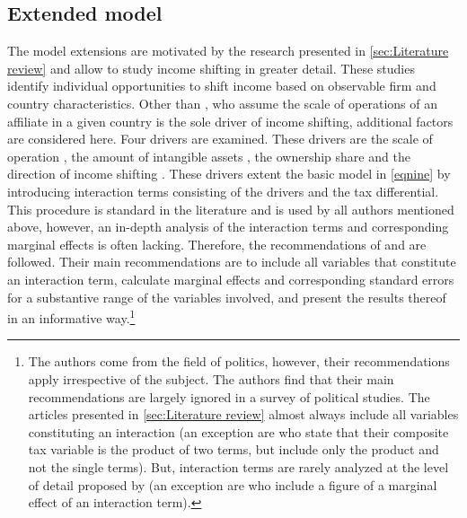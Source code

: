 \documentclass[10pt,twocolumn,oneside,cmyk]{article}
\begin{document}
\subsection{Extended model} \label{sec:Extended model}
The model extensions are motivated by the research presented in \cref{sec:Literature review} and allow to study income shifting in greater detail. These studies identify individual opportunities to shift income based on observable firm and country characteristics. Other than \textcite{huizinga_international_2008}, who assume the scale of operations of an affiliate in a given country is the sole driver of income shifting, additional factors are considered here. Four drivers are examined. These drivers are the scale of operation \textcite{huizinga_international_2008}, the amount of intangible assets \parencites{beer_profit_2015}{dischinger_corporate_2011}, the ownership share \parencites{weichenrieder_profit_2009}{dischinger_profit_2008} and the direction of income shifting \parencite{dischinger_role_2014}. These drivers extent the basic model in \cref{eqnine} by introducing interaction terms consisting of the drivers and the tax differential. This procedure is standard in the literature and is used by all authors mentioned above, however, an in-depth analysis of the interaction terms and corresponding marginal effects is often lacking. Therefore, the recommendations of \textcite[64]{brambor_understanding_2006} and \textcite[660]{berry_improving_2012} are followed. Their main recommendations are to include all variables that constitute an interaction term, calculate marginal effects and corresponding standard errors for a substantive range of the variables involved, and present the results thereof in an informative way.\footnote{The authors come from the field of politics, however, their recommendations apply irrespective of the subject. The authors find that their main recommendations are largely ignored in a survey of political studies. The articles presented in \cref{sec:Literature review} almost always include all variables constituting an interaction (an exception are \textcite[1169]{huizinga_international_2008} who state that their composite tax variable is the product of two terms, but include only the product and not the single terms). But, interaction terms are rarely analyzed at the level of detail proposed by \textcite[73-77]{brambor_understanding_2006} (an exception are \textcite[444]{beer_profit_2015} who include a figure of a marginal effect of an interaction term).}
\end{document}

